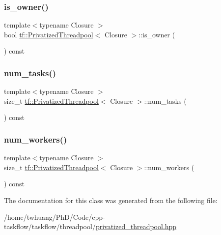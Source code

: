\subsubsection{\texorpdfstring{is\+\_\+owner()}{is\_owner()}}
{\footnotesize\ttfamily template$<$typename Closure $>$ \\
bool \hyperlink{classtf_1_1PrivatizedThreadpool}{tf\+::\+Privatized\+Threadpool}$<$ Closure $>$\+::is\+\_\+owner (\begin{DoxyParamCaption}{ }\end{DoxyParamCaption}) const}

\mbox{\label{classtf_1_1PrivatizedThreadpool_a9eac224d72e13f08f85cf70ba2ac477e}} 
\subsubsection{\texorpdfstring{num\+\_\+tasks()}{num\_tasks()}}
{\footnotesize\ttfamily template$<$typename Closure $>$ \\
size\+\_\+t \hyperlink{classtf_1_1PrivatizedThreadpool}{tf\+::\+Privatized\+Threadpool}$<$ Closure $>$\+::num\+\_\+tasks (\begin{DoxyParamCaption}{ }\end{DoxyParamCaption}) const}

\mbox{\label{classtf_1_1PrivatizedThreadpool_afc5419dbc1bc98f5cd98d3ace43bc137}} 
\subsubsection{\texorpdfstring{num\+\_\+workers()}{num\_workers()}}
{\footnotesize\ttfamily template$<$typename Closure $>$ \\
size\+\_\+t \hyperlink{classtf_1_1PrivatizedThreadpool}{tf\+::\+Privatized\+Threadpool}$<$ Closure $>$\+::num\+\_\+workers (\begin{DoxyParamCaption}{ }\end{DoxyParamCaption}) const}



The documentation for this class was generated from the following file\+:\begin{DoxyCompactItemize}
\item 
/home/twhuang/\+Ph\+D/\+Code/cpp-\/taskflow/taskflow/threadpool/\hyperlink{privatized__threadpool_8hpp}{privatized\+\_\+threadpool.\+hpp}\end{DoxyCompactItemize}
